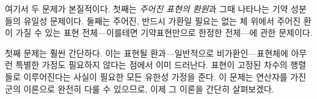 \documentclass[11pt]{article}
\begin{document}
여기서 두 문제가 본질적이다. 첫째는 \emph{주어진 표현의 환원}과 그때 나타나는 기약 성분들의 유일성 문제이다. 둘째는 주어진, 반드시 가환일 필요는 없는 체 위에서 주어진 환이 가질 수 있는 표현 전체---이를테면 기약표현만으로 한정한 전체---에 관한 문제이다.

첫째 문제는 훨씬 간단하다. 이는 표현될 환과---일반적으로 비가환인---표현체에 아무런 특별한 가정도 필요하지 않다는 점에서 이미 드러난다. 표현이 고정된 차수의 행렬들로 이루어진다는 사실이 필요한 모든 유한성 가정을 준다. 이 문제는 연산자를 가진 군의 이론으로 완전히 다룰 수 있으므로, 이제 그 이론을 간단히 살펴보겠다.
\end{document}
